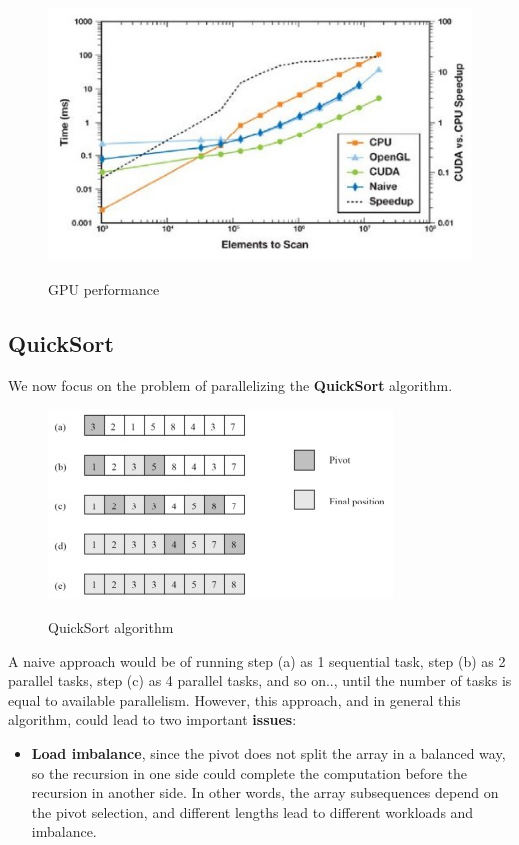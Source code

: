 \begin{figure}[h!]
		\centering
		\includegraphics[scale = 1.5]{img/gpu perf.jpg}
        \label{gpu}
        \caption{GPU performance}
\end{figure}

\subsection{QuickSort}
We now focus on the problem of parallelizing the \textbf{QuickSort} algorithm.

\begin{figure}[h!]
		\centering
		\includegraphics[scale = 2.0]{img/quicksort.jpg}
        \label{quicksort}
        \caption{QuickSort algorithm}
\end{figure}

A naive approach would be of running step (a) as 1 sequential task, step (b) as 2 parallel tasks, step (c) as 4 parallel tasks, and so on.., until the number of tasks is equal to available parallelism. However, this approach, and in general this algorithm, could lead to two important \textbf{issues}:


\begin{itemize}
    \item \textbf{Load imbalance}, since the pivot does not split the array in a balanced way, so the recursion in one side could complete the computation before the recursion in another side. In other words, the array subsequences depend on the pivot selection, and different lengths lead to different workloads and imbalance.
\end{itemize}

